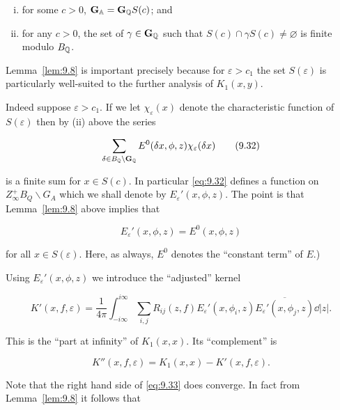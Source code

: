 \begin{enumerate}[(i)]

\item for some $c > 0$, $\mathbf{G}_{\mathbb{A}} = \mathbf{G}_{\mathbb{Q}} S(c)$; and

\item for any $c > 0$, the set of $\gamma \in \mathbf{G}_{\mathbb{Q}}$ such that $S(c) \cap \gamma S(c) \neq \varnothing$ is finite modulo $B_{\mathbb{Q}}$.

\end{enumerate}

Lemma~\ref{lem:9.8} is important precisely because for $\varepsilon > c_1$ the set $S(\varepsilon)$ is particularly well-suited to the further analysis of $K_1(x, y)$.

Indeed suppose $\varepsilon > c_1$. If we let $\chi_\varepsilon(x)$ denote the characteristic function of $S(\varepsilon)$ then by (ii) above the series

\begin{equation}\label{eq:9.32}
\sum_{\delta \in B_{\mathbb{Q}} \backslash \mathbf{G}_{\mathbb{Q}}} E^0(\delta x, \phi, z)\chi_\varepsilon(\delta x)\tag{9.32}
\end{equation}

is a finite sum for $x \in S(c)$. In particular \eqref{eq:9.32} defines a function on $Z_\infty^{+}B_Q \backslash G_A$ which we shall denote by $E_\varepsilon'(x, \phi, z)$. The point is that Lemma~\ref{lem:9.8} above implies that

\[
E_\varepsilon'(x, \phi, z) = E^0(x, \phi, z)
\]

for all $x \in S(\varepsilon)$. Here, as always, $E^0$ denotes the ``constant term'' of $E$.)

Using $E_\varepsilon'(x,\phi,z)$ we introduce the ``adjusted'' kernel

\begin{equation}\label{eq:9.33}
K'(x, f, \varepsilon) = \frac{1}{4\pi}\int_{-i\infty}^{i\infty}\sum_{i, j} R_{ij}(z, f)E_\varepsilon'(x, \phi_i, z)\overline{E_\varepsilon'(x, \phi_j, z)}\dd|z|.\tag{9.33}
\end{equation}

This is the ``part at infinity'' of $K_1(x,x)$. Its ``complement'' is

\begin{equation}\label{eq:9.34}
K''(x, f, \varepsilon) = K_1(x, x) - K'(x, f, \varepsilon).\tag{9.34}
\end{equation}

Note that the right hand side of \eqref{eq:9.33} does converge. In fact from Lemma~\ref{lem:9.8} it follows that

